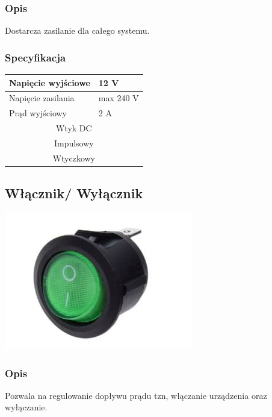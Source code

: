 \documentclass[12pt]{article}
\begin{document}
\subsubsection{Opis}
Dostarcza zasilanie dla całego systemu.
\subsubsection{Specyfikacja}
\begin{center}
\begin{tabular}{ | m{5cm} | m{3cm} | } 
\hline
Napięcie wyjściowe &  12 V\\ 
\hline
Napięcie zasilania & max 240 V\\ 
\hline
Prąd wyjściowy& 2 A\\
\hline 
\multicolumn{2}{|c|}{Wtyk DC}\\
\hline 
\multicolumn{2}{|c|}{Impulsowy}\\
\hline  
\multicolumn{2}{|c|}{Wtyczkowy}\\ 
\hline
\end{tabular}
\end{center}
\subsection{Włącznik/ Wyłącznik}
\begin{center}
\begin{minipage}[H]{.65\textwidth}
    \includegraphics[width=1.0\linewidth]{switcher.png}
\end{minipage}
\end{center}
\subsubsection{Opis}
Pozwala na regulowanie dopływu prądu tzn, włączanie urządzenia oraz wyłączanie.
\end{document}
